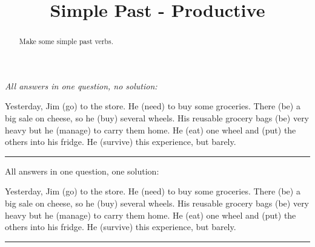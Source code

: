 \documentclass{ximera}
\title{Simple Past - Productive}
\begin{document}
\begin{abstract}
Make some simple past verbs.
\end{abstract}
\maketitle

\textit{All answers in one question, no solution:}

\begin{question}
Yesterday, Jim  (go) to the store. He  (need) to buy some groceries. There  (be) a big sale on cheese, so he  (buy) several wheels. His reusable grocery bags  (be) very heavy but he  (manage) to carry them home. He  (eat) one wheel and  (put) the others into his fridge. He  (survive) this experience, but barely.

\end{question}

\rule{1cm}{1pt}

\begin{question}
\begin{solution}

All answers in one question, one solution:

Yesterday, Jim  (go) to the store. He  (need) to buy some groceries. There  (be) a big sale on cheese, so he  (buy) several wheels. His reusable grocery bags  (be) very heavy but he  (manage) to carry them home. He  (eat) one wheel and  (put) the others into his fridge. He  (survive) this experience, but barely.

\end{solution}
\end{question}

\rule{1cm}{1pt}
\end{document}
